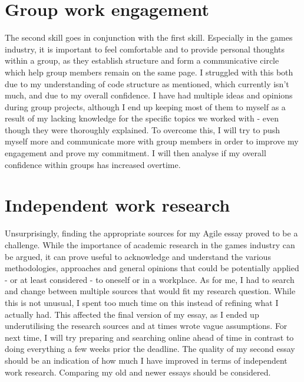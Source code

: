 \documentclass{scrartcl}
\begin{document}
\section{Group work engagement}
The second skill goes in conjunction with the first skill. Especially in the games industry, it is important to feel comfortable and to provide personal thoughts within a group, as they establish structure and form a communicative circle which help group members remain on the same page. I struggled with this both due to my understanding of code structure as mentioned, which currently isn't much, and due to my overall confidence. I have had multiple ideas and opinions during group projects, although I end up keeping most of them to myself as a result of my lacking knowledge for the specific topics we worked with - even though they were thoroughly explained. To overcome this, I will try to push myself more and communicate more with group members in order to improve my engagement and prove my commitment. I will then analyse if my overall confidence within groups has increased overtime. 

\section{Independent work research}
Unsurprisingly, finding the appropriate sources for my Agile essay proved to be a challenge. While the importance of academic research in the games industry can be argued, it can prove useful to acknowledge and understand the various methodologies, approaches and general opinions that could be potentially applied - or at least considered - to oneself or in a workplace. As for me, I had to search and change between multiple sources that would fit my research question. While this is not unusual, I spent too much time on this instead of refining what I actually had. This affected the final version of my essay, as I ended up underutilising the research sources and at times wrote vague assumptions. For next time, I will try preparing and searching online ahead of time in contrast to doing everything a few weeks prior the deadline. The quality of my second essay should be an indication of how much I have improved in terms of independent work research. Comparing my old and newer essays should be considered.
\end{document}
